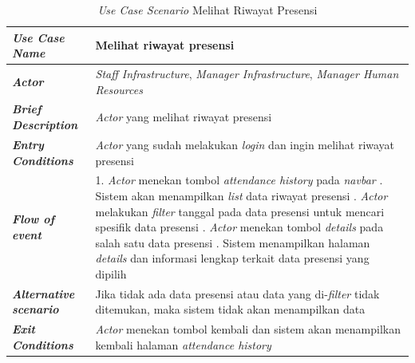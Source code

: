 \FloatBarrier
\begin{longtable}{ |p{6cm}|p{8cm}|}
\caption{\textit{Use Case Scenario} Melihat Riwayat Presensi}\label{tab:use-case-scenario-melihat-riwayat-presensi} 
\\
\hline
\textbf{\textit{Use Case Name}}
&Melihat riwayat presensi
\\ \hline

\textbf{\textit{Actor}}
&\textit{Staff Infrastructure}, \textit{Manager Infrastructure}, \textit{Manager Human Resources}
\\ \hline

\textbf{\textit{Brief Description}}
&\textit{Actor} yang melihat riwayat presensi
\\ \hline

\textbf{\textit{Entry Conditions}}
&\textit{Actor} yang sudah melakukan \textit{login} dan ingin melihat riwayat presensi
\\ \hline

\textbf{\textit{Flow of event}}
&1. \textit{Actor} menekan tombol \textit{attendance history} pada \textit{navbar}
\newline
2. Sistem akan menampilkan \textit{list} data riwayat presensi
\newline
3. \textit{Actor} melakukan \textit{filter} tanggal pada data presensi untuk mencari spesifik data presensi
\newline
4. \textit{Actor} menekan tombol \textit{details} pada salah satu data presensi
\newline
5. Sistem menampilkan halaman \textit{details} dan informasi lengkap terkait data presensi yang dipilih
\newline
\\ \hline

\textbf{\textit{Alternative scenario}}
&Jika tidak ada data presensi atau data yang di-\textit{filter} tidak ditemukan, maka sistem tidak akan menampilkan data
\\ \hline

\textbf{\textit{Exit Conditions}}
&\textit{Actor} menekan tombol kembali dan sistem akan menampilkan kembali halaman \textit{attendance history}
\\ \hline
\end{longtable}

